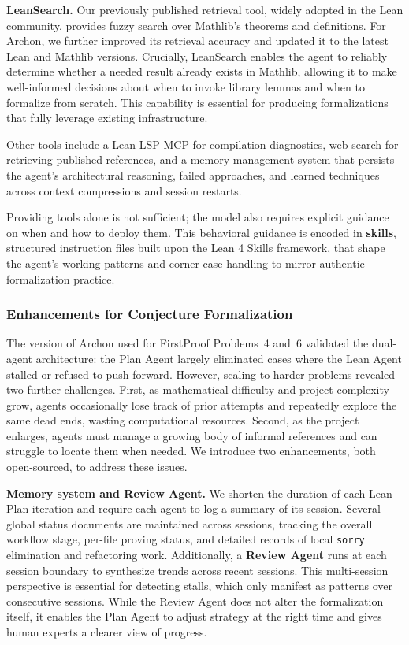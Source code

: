 \documentclass[]{pkuai4m}
\theoremstyle{plain}
\theoremstyle{definition}
\begin{document}
\textbf{LeanSearch.} Our previously published retrieval tool, widely adopted in the Lean community, provides fuzzy search over Mathlib's theorems and definitions. For Archon, we further improved its retrieval accuracy and updated it to the latest Lean and Mathlib versions. Crucially, LeanSearch enables the agent to reliably determine whether a needed result already exists in Mathlib, allowing it to make well-informed decisions about when to invoke library lemmas and when to formalize from scratch. This capability is essential for producing formalizations that fully leverage existing infrastructure.

Other tools include a Lean LSP MCP for compilation diagnostics, web search for retrieving published references, and a memory management system that persists the agent's architectural reasoning, failed approaches, and learned techniques across context compressions and session restarts.

Providing tools alone is not sufficient; the model also requires explicit guidance on when and how to deploy them. This behavioral guidance is encoded in \textbf{skills}, structured instruction files built upon the Lean 4 Skills framework, that shape the agent's working patterns and corner-case handling to mirror authentic formalization practice.







\subsubsection{Enhancements for Conjecture Formalization\label{subsubsec:enhancements}}

The version of Archon used for FirstProof Problems~4 and~6 validated the dual-agent architecture: the Plan Agent largely eliminated cases where the Lean Agent stalled or refused to push forward. However, scaling to harder problems revealed two further challenges. First, as mathematical difficulty and project complexity grow, agents occasionally lose track of prior attempts and repeatedly explore the same dead ends, wasting computational resources. Second, as the project enlarges, agents must manage a growing body of informal references and can struggle to locate them when needed. We introduce two enhancements, both open-sourced, to address these issues.

\textbf{Memory system and Review Agent.} We shorten the duration of each Lean--Plan iteration and require each agent to log a summary of its session. Several global status documents are maintained across sessions, tracking the overall workflow stage, per-file proving status, and detailed records of local \texttt{sorry} elimination and refactoring work. Additionally, a \textbf{Review Agent} runs at each session boundary to synthesize trends across recent sessions. This multi-session perspective is essential for detecting stalls, which only manifest as patterns over consecutive sessions. While the Review Agent does not alter the formalization itself, it enables the Plan Agent to adjust strategy at the right time and gives human experts a clearer view of progress.
\end{document}
